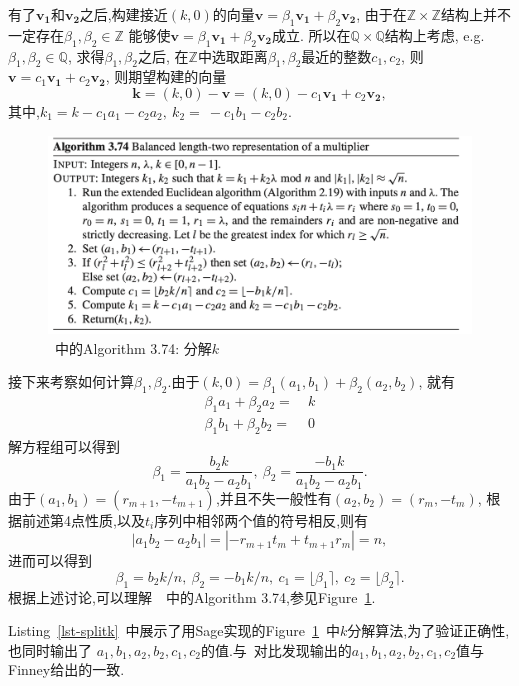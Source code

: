 \documentclass{article}
\newcommand{\Z}{\mathbb{Z}}
\newcommand{\Q}{\mathbb{Q}}
\begin{document}
有了$\mathbf{v_1}$和$\mathbf{v_2}$之后,构建接近$(k,0)$的向量$\mathbf{v} = \beta_1\mathbf{v_1} + \beta_2\mathbf{v_2}$,
由于在$\Z\times\Z$结构上并不一定存在$\beta_1, \beta_2 \in \Z$
能够使$\mathbf{v} = \beta_1\mathbf{v_1} + \beta_2\mathbf{v_2}$成立.
所以在$\Q\times\Q$结构上考虑, e.g. $\beta_1, \beta_2 \in \Q$,
求得$\beta_1, \beta_2$之后, 在$\Z$中选取距离$\beta_1, \beta_2$最近的整数$c_1, c_2$,
则$\mathbf{v} = c_1\mathbf{v_1} + c_2\mathbf{v_2}$, 则期望构建的向量 
$$\mathbf{k} = (k,0) - \mathbf{v} = (k, 0) - c_1\mathbf{v_1} + c_2\mathbf{v_2},$$
其中,$k_1 =  k - c_1a_1 - c_2a_2, \ k_2 = \ -c_1b_1-c_2b_2$.

\begin{figure}[h]
\centering
\caption{\cite{guidetoecc}~中的Algorithm 3.74: 分解$k$}\label{fig-splitk}
\includegraphics[width=\textwidth]{split-k.png}
\end{figure}


接下来考察如何计算$\beta_1, \beta_2$.由于$(k, 0) = \beta_1(a_1,b_1) + \beta_2(a_2, b_2)$, 就有
\begin{equation}\nonumber
\begin{split}
\beta_1a_1 + \beta_2a_2 =& \  k\\
\beta_1b_1 + \beta_2b_2 =& \ 0
\end{split}
\end{equation}
解方程组可以得到
$$\beta_1 = \dfrac{b_2k}{a_1b_2 - a_2b_1}, \ \beta_2 = \dfrac{-b_1k}{a_1b_2-a_2b_1}.$$
由于$(a_1, b_1) = (r_{m+1}, - t_{m+1})$,并且不失一般性有$(a_2, b_2) = (r_{m}, - t_{m})$, 
根据前述第4点性质,以及$t_i$序列中相邻两个值的符号相反,则有
$$|a_1b_2-a_2b_1| = |-r_{m+1}t_{m}+ t_{m+1}r_{m}| = n,$$
进而可以得到
$$\beta_1 = b_2k / n, \ \beta_2 = -b_1k/n, \ c_1 = \lfloor \beta_1 \rceil, \  c_2 = \lfloor \beta_2 \rceil.$$
根据上述讨论,可以理解~\cite{guidetoecc}~中的Algorithm 3.74,参见Figure~\ref{fig-splitk}.

Listing~\ref{lst-splitk}~中展示了用Sage实现的Figure~\ref{fig-splitk}~中$k$分解算法,为了验证正确性,也同时输出了
$a_1, b_1, a_2, b_2, c_1, c_2$的值.与~\cite{halfinney}对比发现输出的$a_1, b_1, a_2, b_2, c_1, c_2$值与Finney给出的一致.
\end{document}
